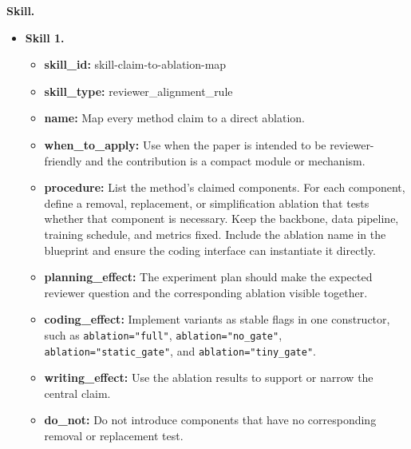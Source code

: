 \documentclass{opendatalab}
\begin{document}
\begin{tcolorbox}
\textbf{Skill.}
\begin{itemize}\setlength\itemsep{2pt}
  \item \textbf{Skill 1.}
  \begin{itemize}\setlength\itemsep{1pt}
    \item \textbf{skill\_id:} skill-claim-to-ablation-map
    \item \textbf{skill\_type:} reviewer\_alignment\_rule
    \item \textbf{name:} Map every method claim to a direct ablation.
    \item \textbf{when\_to\_apply:} Use when the paper is intended to be reviewer-friendly and the contribution is a compact module or mechanism.
    \item \textbf{procedure:} List the method's claimed components. For each component, define a removal, replacement, or simplification ablation that tests whether that component is necessary. Keep the backbone, data pipeline, training schedule, and metrics fixed. Include the ablation name in the blueprint and ensure the coding interface can instantiate it directly.
    \item \textbf{planning\_effect:} The experiment plan should make the expected reviewer question and the corresponding ablation visible together.
    \item \textbf{coding\_effect:} Implement variants as stable flags in one constructor, such as \texttt{ablation="full"}, \texttt{ablation="no\_gate"}, \texttt{ablation="static\_gate"}, and \texttt{ablation="tiny\_gate"}.
    \item \textbf{writing\_effect:} Use the ablation results to support or narrow the central claim.
    \item \textbf{do\_not:} Do not introduce components that have no corresponding removal or replacement test.
  \end{itemize}


\end{itemize}
\end{tcolorbox}
\end{document}

